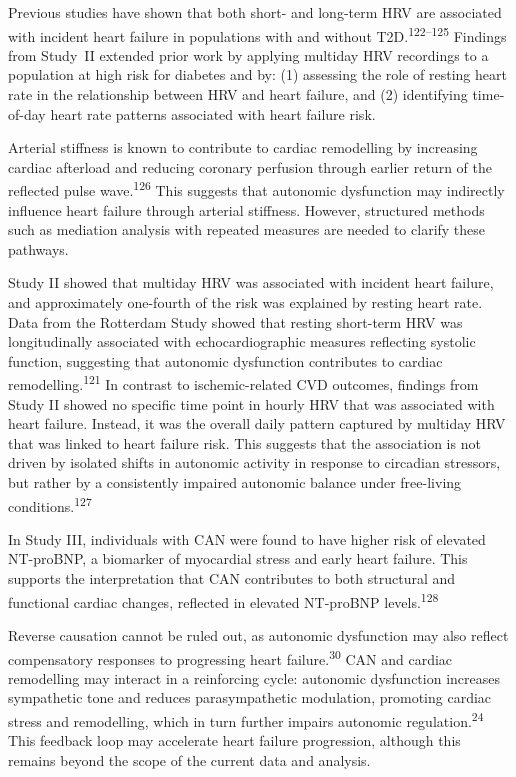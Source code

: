 \documentclass[
  a4paper,
  headsepline=true,
  open=left]{scrbook}
\begin{document}
Previous studies have shown that both short- and long-term HRV are
associated with incident heart failure in populations with and without
T2D.\textsuperscript{122--125} Findings from Study \,II extended prior
work by applying multiday HRV recordings to a population at high risk
for diabetes and by: (1) assessing the role of resting heart rate in the
relationship between HRV and heart failure, and (2) identifying
time-of-day heart rate patterns associated with heart failure risk.

Arterial stiffness is known to contribute to cardiac remodelling by
increasing cardiac afterload and reducing coronary perfusion through
earlier return of the reflected pulse wave.\textsuperscript{126} This
suggests that autonomic dysfunction may indirectly influence heart
failure through arterial stiffness. However, structured methods such as
mediation analysis with repeated measures are needed to clarify these
pathways.

Study II showed that multiday HRV was associated with incident heart
failure, and approximately one-fourth of the risk was explained by
resting heart rate. Data from the Rotterdam Study showed that resting
short-term HRV was longitudinally associated with echocardiographic
measures reflecting systolic function, suggesting that autonomic
dysfunction contributes to cardiac remodelling.\textsuperscript{121} In
contrast to ischemic-related CVD outcomes, findings from Study II showed
no specific time point in hourly HRV that was associated with heart
failure. Instead, it was the overall daily pattern captured by multiday
HRV that was linked to heart failure risk. This suggests that the
association is not driven by isolated shifts in autonomic activity in
response to circadian stressors, but rather by a consistently impaired
autonomic balance under free-living conditions.\textsuperscript{127}

In Study III, individuals with CAN were found to have higher risk of
elevated NT-proBNP, a biomarker of myocardial stress and early heart
failure. This supports the interpretation that CAN contributes to both
structural and functional cardiac changes, reflected in elevated
NT-proBNP levels.\textsuperscript{128}

Reverse causation cannot be ruled out, as autonomic dysfunction may also
reflect compensatory responses to progressing heart
failure.\textsuperscript{30} CAN and cardiac remodelling may interact in
a reinforcing cycle: autonomic dysfunction increases sympathetic tone
and reduces parasympathetic modulation, promoting cardiac stress and
remodelling, which in turn further impairs autonomic
regulation.\textsuperscript{24} This feedback loop may accelerate heart
failure progression, although this remains beyond the scope of the
current data and analysis.
\end{document}
